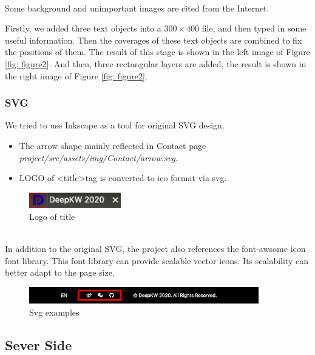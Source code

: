 \documentclass{article}
\begin{document}
~\\
\noindent
Some background and unimportant images are cited from the Internet.

\noindent
Firstly, we added three text objects into a $ 300 \times 400 $ file, and then 
typed in some useful information. Then the coverages of these text objects are
combined to fix the positions of them. The result of this stage is shown in the 
left image of Figure \ref{fig: figure2}. And then, three rectangular layers are 
added, the result is shown in the right image of Figure \ref{fig: figure2}. 



\subsubsection{SVG}
We tried to use Inkscape as a tool for original SVG design.
\begin{itemize}
    \item The arrow shape mainly reflected in Contact page \textit{project/src/assets/img/Contact/arrow.svg}.
    \item LOGO  of \textless title\textgreater\space tag is converted to ico format via svg.
\end{itemize} 

\begin{figure}[h]
    \centering
    \includegraphics[width=4cm]{img/exp/svg1.png}
    \caption{Logo of title}
    \label{}
\end{figure}

~\\
\noindent
In addition to the original SVG, the project also references the 
font-awsome icon font library. This font library can provide 
scalable vector icons. Its scalability can better adapt to the page size.
\begin{figure}[h]
    \centering
    \includegraphics[width=10cm]{img/exp/svg.png}
    \caption{Svg examples}
    \label{}
\end{figure}

\subsection{Sever Side}
\end{document}
